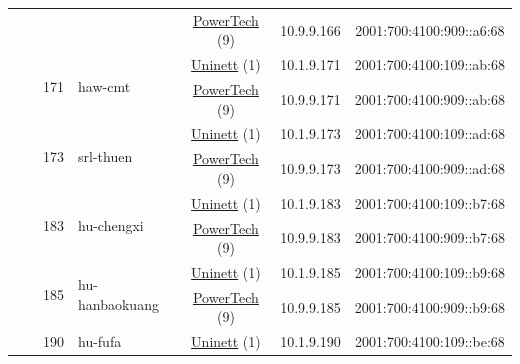 \begin{small}
\begin{center}
\begin{longtable}{|c|c|c|c|c|c|c|c|}
  &  &  &  & \multicolumn{2}{|c|}{\tiny{\href{http://www.powertech.no}{PowerTech} (9)}} & \tiny{10.9.9.166} & \tiny{2001:700:4100:909::a6:68} \\* \cline{3-3}\cline{4-4}\cline{5-5}\cline{6-6}\cline{7-7}\cline{8-8}
  &  & \multirow{2}{*}{\tiny{171}} & \multicolumn{1}{|l|}{\multirow{2}{*}{\tiny{haw-cmt}}} & \multicolumn{2}{|c|}{\tiny{\href{https://www.uninett.no}{Uninett} (1)}} & \tiny{10.1.9.171} & \tiny{2001:700:4100:109::ab:68} \\* \cline{5-5}\cline{6-6}\cline{7-7}\cline{8-8}
  &  &  &  & \multicolumn{2}{|c|}{\tiny{\href{http://www.powertech.no}{PowerTech} (9)}} & \tiny{10.9.9.171} & \tiny{2001:700:4100:909::ab:68} \\* \cline{3-3}\cline{4-4}\cline{5-5}\cline{6-6}\cline{7-7}\cline{8-8}
  &  & \multirow{2}{*}{\tiny{173}} & \multicolumn{1}{|l|}{\multirow{2}{*}{\tiny{srl-thuen}}} & \multicolumn{2}{|c|}{\tiny{\href{https://www.uninett.no}{Uninett} (1)}} & \tiny{10.1.9.173} & \tiny{2001:700:4100:109::ad:68} \\* \cline{5-5}\cline{6-6}\cline{7-7}\cline{8-8}
  &  &  &  & \multicolumn{2}{|c|}{\tiny{\href{http://www.powertech.no}{PowerTech} (9)}} & \tiny{10.9.9.173} & \tiny{2001:700:4100:909::ad:68} \\* \cline{3-3}\cline{4-4}\cline{5-5}\cline{6-6}\cline{7-7}\cline{8-8}
  &  & \multirow{2}{*}{\tiny{183}} & \multicolumn{1}{|l|}{\multirow{2}{*}{\tiny{hu-chengxi}}} & \multicolumn{2}{|c|}{\tiny{\href{https://www.uninett.no}{Uninett} (1)}} & \tiny{10.1.9.183} & \tiny{2001:700:4100:109::b7:68} \\* \cline{5-5}\cline{6-6}\cline{7-7}\cline{8-8}
  &  &  &  & \multicolumn{2}{|c|}{\tiny{\href{http://www.powertech.no}{PowerTech} (9)}} & \tiny{10.9.9.183} & \tiny{2001:700:4100:909::b7:68} \\* \cline{3-3}\cline{4-4}\cline{5-5}\cline{6-6}\cline{7-7}\cline{8-8}
  &  & \multirow{2}{*}{\tiny{185}} & \multicolumn{1}{|l|}{\multirow{2}{*}{\tiny{hu-hanbaokuang}}} & \multicolumn{2}{|c|}{\tiny{\href{https://www.uninett.no}{Uninett} (1)}} & \tiny{10.1.9.185} & \tiny{2001:700:4100:109::b9:68} \\* \cline{5-5}\cline{6-6}\cline{7-7}\cline{8-8}
  &  &  &  & \multicolumn{2}{|c|}{\tiny{\href{http://www.powertech.no}{PowerTech} (9)}} & \tiny{10.9.9.185} & \tiny{2001:700:4100:909::b9:68} \\* \cline{3-3}\cline{4-4}\cline{5-5}\cline{6-6}\cline{7-7}\cline{8-8}
  &  & \multirow{2}{*}{\tiny{190}} & \multicolumn{1}{|l|}{\multirow{2}{*}{\tiny{hu-fufa}}} & \multicolumn{2}{|c|}{\tiny{\href{https://www.uninett.no}{Uninett} (1)}} & \tiny{10.1.9.190} & \tiny{2001:700:4100:109::be:68} \\* \cline{5-5}\cline{6-6}\cline{7-7}\cline{8-8}

\end{longtable}
\end{center}
\end{small}
